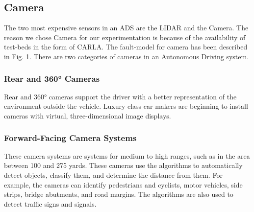 %

\subsection{Camera}
The two most expensive sensors in an ADS are the LIDAR and the Camera. The reason we chose Camera for our experimentation is because of the availability of test-beds in the form of CARLA. The fault-model for camera has been described in Fig. 1. There are two categories of  cameras in an Autonomous Driving   system. 	
\subsubsection{Rear and 360° Cameras} 
	Rear and 360° cameras support the driver with a better representation of the environment outside the vehicle. Luxury class car makers are beginning to install cameras with virtual, three-dimensional image displays.

\subsubsection{Forward-Facing Camera Systems}
	 These camera systems are systems for medium to high ranges, such as in the area between 100 and 275 yards. These cameras use the algorithms to automatically detect objects, classify them, and determine the distance from them. For example, the cameras can identify pedestrians and cyclists, motor vehicles, side strips, bridge abutments, and road margins. The algorithms are also used to detect traffic signs and signals.


